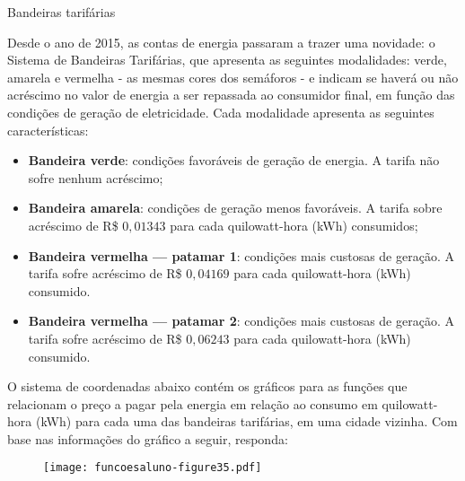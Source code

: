 \documentclass[extrafontsizes, twoside, 11pt, openright, final]{memoir}
\begin{document}
\clearpage

\begin{task}{Bandeiras tarifárias}

	Desde o ano de 2015, as contas de energia passaram a trazer uma novidade: o Sistema de Bandeiras Tarifárias, que apresenta as seguintes modalidades: verde, amarela e vermelha - as mesmas cores dos semáforos - e indicam se haverá ou não acréscimo no valor de energia a ser repassada ao consumidor final, em função das condições de geração de eletricidade. Cada modalidade apresenta as seguintes características:


	\begin{itemize}
		\item \textbf{Bandeira verde}: condições favoráveis de geração de energia. A tarifa não sofre nenhum acréscimo;

		\item \textbf{Bandeira amarela}: condições de geração menos favoráveis. A tarifa sobre acréscimo de R\$ $0{,}01343$ para cada quilowatt-hora (kWh) consumidos;

		\item \textbf{Bandeira vermelha --- patamar 1}: condições mais custosas de geração. A tarifa sofre acréscimo de R\$ $0{,}04169$ para cada quilowatt-hora (kWh) consumido.

		\item \textbf{Bandeira vermelha --- patamar 2}: condições mais custosas de geração. A tarifa sofre acréscimo de R\$ $0{,}06243$ para cada quilowatt-hora (kWh) consumido.
	\end{itemize}


	\justify
	O sistema de coordenadas abaixo contém os gráficos para as funções que relacionam o preço a pagar pela energia em relação ao consumo em quilowatt-hora (kWh) para cada uma das bandeiras tarifárias, em uma cidade vizinha. Com base nas informações do gráfico a seguir, responda:

	\begin{figure}[H]
		\begin{center}
			\centering

			\texttt{[image: funcoesaluno-figure35.pdf]}
		\end{center}
	\end{figure}


\end{task}
\end{document}
